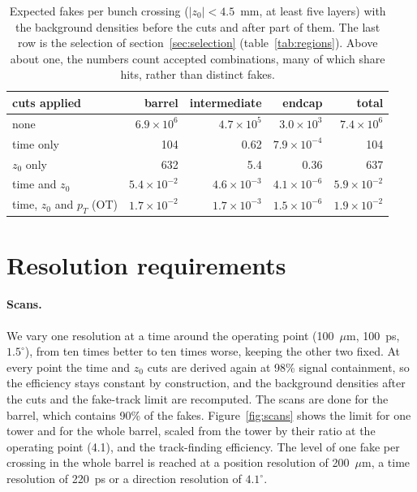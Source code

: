 \IfFileExists{jinst.cls}{\documentclass[a4paper,11pt]{jinst}}
\newcommand{\pT}{p_T}
\begin{document}
\begin{table}[htbp]
  \centering
  \caption{Expected fakes per bunch crossing ($|z_0|<4.5$~mm, at least five layers) with the
  background densities before the cuts and after part of them. The last row is the selection of
  section~\ref{sec:selection} (table~\ref{tab:regions}). Above about one, the numbers count accepted
  combinations, many of which share hits, rather than distinct fakes.}
  \label{tab:stages}
  \begin{tabular}{lrrrr}
    \toprule
    cuts applied & barrel & intermediate & endcap & total \\
    \midrule
    none                      & $6.9\times10^{6}$  & $4.7\times10^{5}$  & $3.0\times10^{3}$  & $7.4\times10^{6}$ \\
    time only                 & 104                & 0.62               & $7.9\times10^{-4}$ & 104 \\
    $z_0$ only                & 632                & 5.4                & 0.36               & 637 \\
    time and $z_0$            & $5.4\times10^{-2}$ & $4.6\times10^{-3}$ & $4.1\times10^{-6}$ & $5.9\times10^{-2}$ \\
    time, $z_0$ and $\pT$ (OT) & $1.7\times10^{-2}$ & $1.7\times10^{-3}$ & $1.5\times10^{-6}$ & $1.9\times10^{-2}$ \\
    \bottomrule
  \end{tabular}
\end{table}

\section{Resolution requirements}\label{sec:scans}

\paragraph{Scans.} We vary one resolution at a time around the operating point (100~$\mu$m,
100~ps, $1.5^\circ$), from ten times better to ten times worse, keeping the other two fixed. At
every point the time and $z_0$ cuts are derived again at 98\% signal containment, so the efficiency
stays constant by construction, and the background densities after the cuts and the fake-track
limit are recomputed. The scans are done for the barrel, which contains 90\% of the fakes.
Figure~\ref{fig:scans} shows the limit for one tower and for the whole barrel, scaled from the tower
by their ratio at the operating point (4.1), and the track-finding efficiency. The level of one fake
per crossing in the whole barrel is reached at a position resolution of
200~$\mu$m, a time resolution of 220~ps or a direction resolution of $4.1^\circ$.
\end{document}
